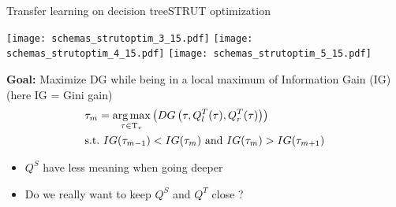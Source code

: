 \begin{frame}{Transfer learning on decision tree}{STRUT optimization}
\begin{minipage}[t]{0.4\linewidth}
    \vspace{0pt}
    \renewcommand{\ratio}{1.0}
    \begin{overprint}
        \texttt{[image: schemas\_strutoptim\_3\_15.pdf]}
        \texttt{[image: schemas\_strutoptim\_4\_15.pdf]}
        \texttt{[image: schemas\_strutoptim\_5\_15.pdf]}
    \end{overprint}
\end{minipage}\hfill
\begin{minipage}[t]{0.55\linewidth}
    \vspace{0pt}
    
    \textbf{Goal: } Maximize DG while being in a local maximum of Information Gain (IG) (here IG = Gini gain)
    \pause \pause \pause
    \begin{align*}
        &\tau_{m} = \operatorname*{arg\,max}_{\tau \in \mathrm{T}_{v}}\left(DG\left(  \tau ,  Q_{l}^{T}(\tau), Q_{r}^{T}(\tau)\right)\right) \\
        &\text{s.t.\ } IG(\tau_{m-1}) < IG(\tau_{m}) \text{ and } IG(\tau_{m}) > IG(\tau_{m+1})
    \end{align*}
    \vspace{1cm}

    \pause
    \begin{itemize}
        \item  $Q^S$ have less meaning when going deeper
        \item  Do we really want to keep $Q^S$ and $Q^T$ close ?
    \end{itemize}
\end{minipage}

\end{frame}

